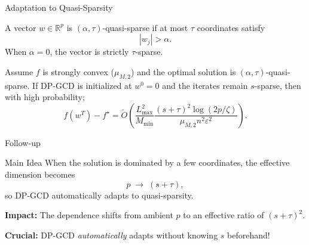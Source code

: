 \documentclass[10pt]{beamer}
\begin{document}
\begin{frame}{Adaptation to Quasi-Sparsity}

\begin{definition}
A vector $w \in \mathbb{R}^p$ is $(\alpha,\tau)$-quasi-sparse if at most $\tau$ coordinates satisfy
\[
|w_j| > \alpha .
\]
When $\alpha = 0$, the vector is strictly $\tau$-sparse.
\end{definition}

\vspace{1em}

\begin{theorem}
Assume $f$ is strongly convex ($\mu_{M,2}$) and the optimal solution is $(\alpha,\tau)$-quasi-sparse.
If DP-GCD is initialized at $w^0=0$ and the iterates remain $s$-sparse, then with high probability; 
\[
f(w^T) - f^\star
=
\tilde{O}\!\left(
\frac{L_{\max}^2}{M_{\min}}
\frac{(s+\tau)^2 \log(2p/\zeta)}{\mu_{M,2} n^2 \varepsilon^2}
\right).
\]
\end{theorem}

\end{frame}

\begin{frame}{Follow-up}

\vspace{1em}

\begin{alertblock}{Main Idea}
When the solution is dominated by a few coordinates, the effective dimension becomes
\[
p \;\rightarrow\; (s+\tau),
\]
so DP-GCD automatically adapts to quasi-sparsity.
\end{alertblock}

\vspace{1em}
\textbf{Impact:} The dependence shifts from ambient $p$ to an effective ratio of \alert{$(s+\tau)^2$}.

\vspace{0.5em}
\textbf{Crucial:} DP-GCD \emph{automatically} adapts without knowing $s$ beforehand!
\end{frame}
\end{document}
